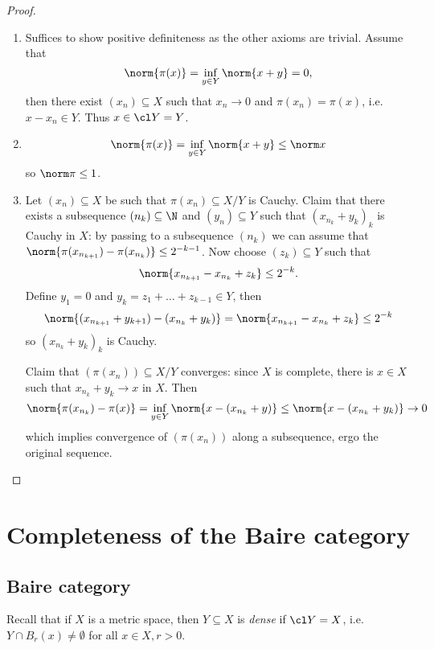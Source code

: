 \documentclass[a4paper]{article}
\begin{document}
\begin{proof}\leavevmode
  \begin{enumerate}
  \item Suffices to show positive definiteness as the other axioms are trivial. Assume that
    \[
      \norm{\pi(x)} = \inf_{y \in Y} \norm{x + y} = 0,
    \]
    then there exist \((x_n) \subseteq X\) such that \(x_n \to 0\) and \(\pi(x_n) = \pi(x)\), i.e.\ \(x - x_n \in Y\). Thus \(x \in \cl Y = Y\).
  \item
    \[
      \norm{\pi(x)} = \inf_{y \in Y} \norm{x + y} \leq \norm x
    \]
    so \(\norm \pi \leq 1\).
  \item Let \((x_n) \subseteq X\) be such that \(\pi(x_n) \subseteq X / Y\) is Cauchy. Claim that there exists a subsequence \((n_k) \subseteq \N\) and \((y_n) \subseteq Y\) such that \((x_{n_k} + y_k)_k\) is Cauchy in \(X\): by passing to a subsequence \((n_k)\) we can assume that \(\norm{\pi(x_{n_{k + 1}}) - \pi(x_{n_k})} \leq 2^{-k - 1}\). Now choose \((z_k) \subseteq Y\) such that
    \[
      \norm{x_{n_{k + 1}} - x_{n_k} + z_k} \leq 2^{-k}.
    \]
    Define \(y_1 = 0\) and \(y_k = z_1 + \dots + z_{k - 1} \in Y\), then
    \[
      \norm{(x_{n_{k + 1}} + y_{k + 1}) - (x_{n_k} + y_k)}
      = \norm{x_{n_{k + 1}} - x_{n_k} + z_k}
        \leq 2^{-k}
    \]
    so \((x_{n_k} + y_k)_k\) is Cauchy.

    Claim that \((\pi(x_n)) \subseteq X / Y\) converges: since \(X\) is complete, there is \(x \in X\) such that \(x_{n_k} + y_k \to x\) in \(X\). Then
    \[
      \norm{\pi(x_{n_k}) - \pi(x)}
      = \inf_{y \in Y} \norm{x - (x_{n_k} + y)}
      \leq \norm{x - (x_{n_k} + y_k)}
      \to 0
    \]
    which implies convergence of \((\pi(x_n))\) along a subsequence, ergo the original sequence.
  \end{enumerate}
\end{proof}

\section{Completeness of the Baire category}

\subsection{Baire category}

Recall that if \(X\) is a metric space, then \(Y \subseteq X\) is \emph{dense} if \(\cl Y = X\), i.e.\ \(Y \cap B_r(x) \neq \emptyset\) for all \(x \in X, r > 0\).
\end{document}
